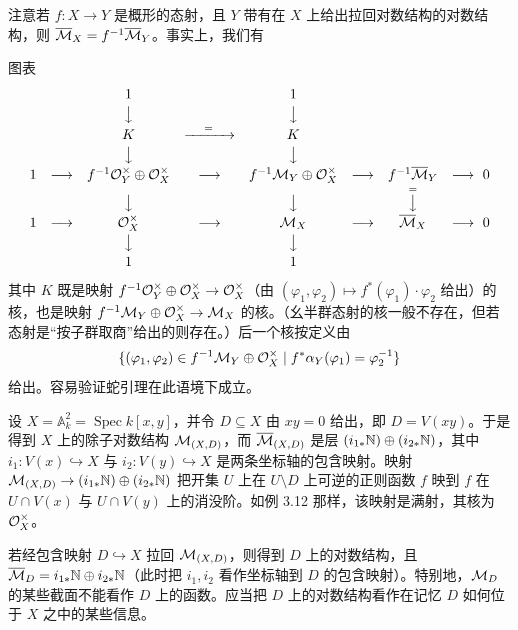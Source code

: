 注意若 $f:X\to Y$ 是概形的态射，且 $Y$ 带有在 $X$ 上给出拉回对数结构的对数结构，则 $\overline{\mathcal{M}}_X=f^{-1}\overline{\mathcal{M}}_Y$。事实上，我们有

图表
\[
  \begin{array}{c@{\quad}c@{\quad}c@{\quad}c@{\quad}c@{\quad}c@{\quad}c@{\quad}c}
    & & 1 & & 1 & & & \\[2pt]
    & & \big\downarrow & & \big\downarrow & & & \\[2pt]
    & & K & \xrightarrow{\hspace{1.2em}=\hspace{1.2em}} & K & & & \\[2pt]
    & & \big\downarrow & & \big\downarrow & & & \\[2pt]
    1 & \longrightarrow & f^{-1}\cO_Y^{\times}\oplus\cO_X^{\times} & \longrightarrow & f^{-1}\cM_Y\oplus\cO_X^{\times} & \longrightarrow & f^{-1}\overline{\cM}_Y & \longrightarrow\ 0\\[2pt]
    & & \big\downarrow & & \big\downarrow & & \overset{=}{\big\downarrow} & \\[2pt]
    1 & \longrightarrow & \cO_X^{\times} & \longrightarrow & \cM_X & \longrightarrow & \overline{\cM}_X & \longrightarrow\ 0\\[2pt]
    & & \big\downarrow & & \big\downarrow & & & \\[2pt]
    & & 1 & & 1 & & &
  \end{array}
\]
其中 $K$ 既是映射 $f^{-1}\mathcal{O}_Y^{\times}\oplus\mathcal{O}_X^{\times}\to\mathcal{O}_X^{\times}$（由 $(\varphi_1,\varphi_2)\mapsto f^*(\varphi_1)\cdot\varphi_2$ 给出）的核，也是映射 $f^{-1}\mathcal{M}_Y\oplus\mathcal{O}_X^{\times}\to\mathcal{M}_X$ 的核。（幺半群态射的核一般不存在，但若态射是“按子群取商”给出的则存在。）后一个核按定义由
\[
  \{(\varphi_1,\varphi_2)\in f^{-1}\mathcal{M}_Y\oplus\mathcal{O}_X^{\times}\mid f^*\alpha_Y(\varphi_1)=\varphi_2^{-1}\}
\]
给出。容易验证蛇引理在此语境下成立。


\begin{example}
设 $X=\mathbb{A}^2_k=\operatorname{Spec} k[x,y]$，并令 $D\subseteq X$ 由 $xy=0$ 给出，即 $D=V(xy)$。于是得到 $X$ 上的除子对数结构 $\mathcal{M}_{(X,D)}$，而 $\overline{\mathcal{M}}_{(X,D)}$ 是层 $(i_{1*}\mathbb{N})\oplus(i_{2*}\mathbb{N})$，其中 $i_1:V(x)\hookrightarrow X$ 与 $i_2:V(y)\hookrightarrow X$ 是两条坐标轴的包含映射。映射 $\mathcal{M}_{(X,D)}\to(i_{1*}\mathbb{N})\oplus(i_{2*}\mathbb{N})$ 把开集 $U$ 上在 $U\setminus D$ 上可逆的正则函数 $f$ 映到 $f$ 在 $U\cap V(x)$ 与 $U\cap V(y)$ 上的消没阶。如例 3.12 那样，该映射是满射，其核为 $\mathcal{O}_X^{\times}$。

若经包含映射 $D\hookrightarrow X$ 拉回 $\mathcal{M}_{(X,D)}$，则得到 $D$ 上的对数结构，且 $\overline{\mathcal{M}}_D=i_{1*}\mathbb{N}\oplus i_{2*}\mathbb{N}$（此时把 $i_1,i_2$ 看作坐标轴到 $D$ 的包含映射）。特别地，$\mathcal{M}_D$ 的某些截面不能看作 $D$ 上的函数。应当把 $D$ 上的对数结构看作在记忆 $D$ 如何位于 $X$ 之中的某些信息。
\end{example}

